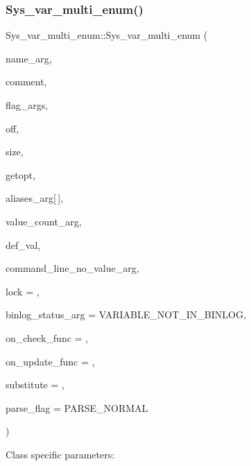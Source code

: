 \subsubsection{\texorpdfstring{Sys\+\_\+var\+\_\+multi\+\_\+enum()}{Sys\_var\_multi\_enum()}}
{\footnotesize\ttfamily Sys\+\_\+var\+\_\+multi\+\_\+enum\+::\+Sys\+\_\+var\+\_\+multi\+\_\+enum (\begin{DoxyParamCaption}\item[{const char $\ast$}]{name\+\_\+arg,  }\item[{const char $\ast$}]{comment,  }\item[{int}]{flag\+\_\+args,  }\item[{ptrdiff\+\_\+t}]{off,  }\item[{size\+\_\+t}]{size,  }\item[{\mbox{\hyperlink{structCMD__LINE}{C\+M\+D\+\_\+\+L\+I\+NE}}}]{getopt,  }\item[{const \mbox{\hyperlink{structSys__var__multi__enum_1_1ALIAS}{A\+L\+I\+AS}}}]{aliases\+\_\+arg\mbox{[}$\,$\mbox{]},  }\item[{uint}]{value\+\_\+count\+\_\+arg,  }\item[{uint}]{def\+\_\+val,  }\item[{uint}]{command\+\_\+line\+\_\+no\+\_\+value\+\_\+arg,  }\item[{\mbox{\hyperlink{classPolyLock}{Poly\+Lock}} $\ast$}]{lock = {},  }\item[{enum \mbox{\hyperlink{classsys__var_a664520ec82191888717c86085bfa83ce}{binlog\+\_\+status\+\_\+enum}}}]{binlog\+\_\+status\+\_\+arg = {\ttfamily VARIABLE\+\_\+NOT\+\_\+IN\+\_\+BINLOG},  }\item[{on\+\_\+check\+\_\+function}]{on\+\_\+check\+\_\+func = {},  }\item[{on\+\_\+update\+\_\+function}]{on\+\_\+update\+\_\+func = {},  }\item[{const char $\ast$}]{substitute = {},  }\item[{int}]{parse\+\_\+flag = {\ttfamily PARSE\+\_\+NORMAL} }\end{DoxyParamCaption})\hspace{0.3cm}{\ttfamily [inline]}}

Class specific parameters\+:


